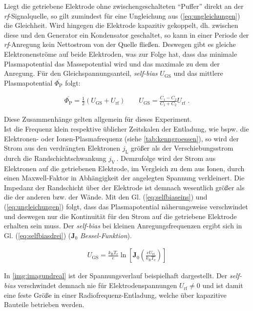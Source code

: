 \documentclass[numbers=noenddot,a4paper]{scrartcl}
\newcommand{\ix}[1]{_\text{#1}}
\newcommand{\tilt}[1]{\textit{#1}}
\begin{document}
					Liegt die getriebene Elektrode ohne zwischengeschalteten ``Puffer'' direkt an der \tilt{rf}-Signalquelle, so gilt zumindest f\"ur eine Ungleichung aus (\ref{eq:ungleichungen}) die Gleichheit. Wird hingegen die Elektrode kapazitiv gekoppelt, dh. zwischen diese und den Generator ein Kondensator geschaltet, so kann in einer Periode der \tilt{rf}-Anregung kein Nettostrom von der Quelle flie{\ss}en. Deswegen gibt es gleiche Elektronenstr\"ome auf beide Elektroden, was zur Folge hat, dass das minimale Plasmapotential das Massepotential wird und das maximale zu dem der Anregung. F\"ur den Gleichspannungsanteil, \tilt{self-bias} $U\ix{GS}$ und das mittlere Plasmapotential $\overline{\Phi\ix{P}}$ folgt:

						\begin{align}
							\overline{\Phi\ix{P}}=\frac{1}{2}\left(U\ix{GS}+U\ix{rf}\right) \quad \quad U\ix{GS}=\frac{C\ix{1}-C\ix{2}}{C\ix{1}+C\ix{2}}U\ix{rf} \,\, .\label{eq:selfbiaszwei} 
						\end{align}

					Diese Zusammenh\"ange gelten allgemein f\"ur dieses Experiment.\\
					Ist die Frequenz klein respektive \"ublicher Zeitskalen der Entladung, wie bspw. die Elektronen- oder Ionen-Plasmafrequenz (siehe \ref{tab:kenngroessen}), so wird der Strom aus den verdr\"angten Elektronen $j\ix{L}$ gr\"o{\ss}er als der Verschiebungsstrom durch die Randschichtschwankung $j\ix{V}\,$. Demzufolge wird der Strom aus Elektronen auf die getriebenen Elektrode, im Vergleich zu dem aus Ionen, durch einen Maxwell-Faktor in Abhängigkeit der angelegten Spannung verkleinert. Die Impedanz der Randschicht über der Elektrode ist demnach wesentlich größer als die der anderen bzw. der Wände. Mit den Gl. (\ref{eq:selfbiaseins}) und (\ref{eq:ungleichungen}) folgt, dass das Plasmapotential näherungsweise verschwindet und deswegen nur die Kontinuität für den Strom auf die getriebene Elektrode erhalten sein muss. Der \tilt{self-bias} bei kleinen Anregungsfrequenzen ergibt sich in Gl. (\ref{eq:selfbiasdrei}) ($\mathbf{J}\ix{0}$ \tilt{Bessel-Funktion}). 

						\begin{align}
							U\ix{GS}=\frac{k\ix{B}T\ix{e}}{e}\ln\left[\mathbf{J}\ix{0}\left(\frac{eU\ix{rf}}{k\ix{B}T\ix{e}}\right)\right] \label{eq:selfbiasdrei}
						\end{align}

					In \ref{img:imagundreal} ist der Spannungsverlauf beispielhaft dargestellt. Der \tilt{self-bias} verschwindet demnach nie für Elektrodenspannungen  $U\ix{rf}\neq0$ und ist damit eine feste Größe in einer Radiofrequenz-Entladung, welche über kapazitive Bauteile betrieben werden.
\end{document}
